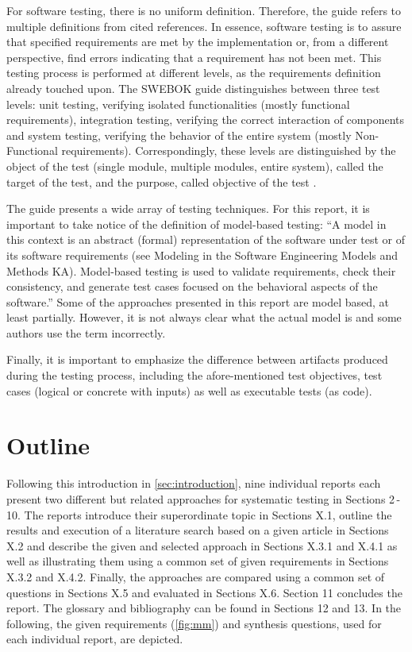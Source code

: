 For software testing, there is no uniform definition.
Therefore, the guide refers to multiple definitions from cited references.
In essence, software testing is to assure that specified requirements are met by the implementation or, from a different perspective, find errors indicating that a requirement has not been met.
This testing process is performed at different levels, as the requirements definition already touched upon. %
The SWEBOK guide distinguishes between three test levels: unit testing, verifying isolated functionalities (mostly functional requirements), integration testing, verifying the correct interaction of components and system testing, verifying the behavior of the entire system (mostly Non-Functional requirements).
Correspondingly, these levels are distinguished by the object of the test (single module, multiple modules, entire system), called the target of the test, and the purpose, called objective of the test \cite{SWEBOK}.

The guide presents a wide array of testing techniques.
For this report, it is important to take notice of the definition of model-based testing: \enquote{A model in this context is an abstract (formal) representation of the software under test or of its software requirements (see Modeling in the Software Engineering Models and Methods KA).
Model-based testing is used to validate requirements, check their consistency, and generate test cases focused on the behavioral aspects of the software.}\cite{SWEBOK}
Some of the approaches presented in this report are model based, at least partially.
However, it is not always clear what the actual model is and some authors use the term incorrectly.

Finally, it is important to emphasize the difference between artifacts produced during the testing process, including the afore-mentioned test objectives, test cases (logical or concrete with inputs) as well as executable tests (as code).

\section{Outline}
\label{sec:intruduction1.3}

Following this introduction in \autoref{sec:introduction}, nine individual reports each present two different but related approaches for systematic testing in Sections 2\,-\,10.
The reports introduce their superordinate topic in Sections X.1, outline the results and execution of a literature search based on a given article in Sections X.2 and describe the given and selected approach in Sections X.3.1 and X.4.1 as well as illustrating them using a common set of given requirements in Sections X.3.2 and X.4.2.
Finally, the approaches are compared using a common set of questions in Sections X.5 and evaluated in Sections X.6.
Section 11 concludes the report.
The glossary and bibliography can be found in Sections 12 and 13.
In the following, the given requirements (\autoref{fig:mm}) and synthesis questions, used for each individual report, are depicted.

